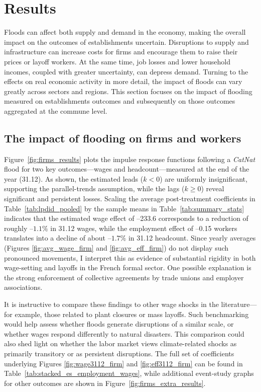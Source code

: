 \chapter{Results}
\label{ch: results}

Floods can affect both supply and demand in the economy, making the overall impact on the outcomes of establishments uncertain. Disruptions to supply and infrastructure can increase costs for firms and encourage them to raise their prices or layoff workers. At the same time, job losses and lower household incomes, coupled with greater uncertainty, can depress demand. Turning to the effects on real economic activity in more detail, the impact of floods can vary greatly across sectors and regions. This section focuses on the impact of flooding measured on establishments outcomes and subsequently on those outcomes aggregated at the commune level.

\section{The impact of flooding on firms and workers}

Figure~\ref{fig:firms_results} plots the impulse response functions following a \textit{CatNat} flood for two key outcomes—wages and headcount—measured at the end of the year (31.12). As shown, the estimated leads ($k < 0$) are uniformly insignificant, supporting the parallel-trends assumption, while the lags ($k \geq 0$) reveal significant and persistent losses. Scaling the average post-treatment coefficients in Table~\ref{tab:lpdid_pooled} by the sample means in Table~\ref{tab:summary_stats} indicates that the estimated wage effect of –233.6 corresponds to a reduction of roughly $–1.1\%$ in 31.12 wages, while the employment effect of –0.15 workers translates into a decline of about $–1.7\%$ in 31.12 headcount. Since yearly averages (Figures \ref{fig:avg_wage_firm} and \ref{fig:avg_eff_firm}) do not display such pronounced movements, I interpret this as evidence of substantial rigidity in both wage-setting and layoffs in the French formal sector. One possible explanation is the strong enforcement of collective agreements by trade unions and employer associations.

It is instructive to compare these findings to other wage shocks in the literature—for example, those related to plant closures or mass layoffs. Such benchmarking would help assess whether floods generate disruptions of a similar scale, or whether wages respond differently to natural disasters. This comparison could also shed light on whether the labor market views climate-related shocks as primarily transitory or as persistent disruptions. The full set of coefficients underlying Figures \ref{fig:wage3112_firm} and \ref{fig:eff3112_firm} can be found in Table~\ref{tab:stacked_es_employment_wages}, while additional event-study graphs for other outcomes are shown in Figure~\ref{fig:firms_extra_results}.

